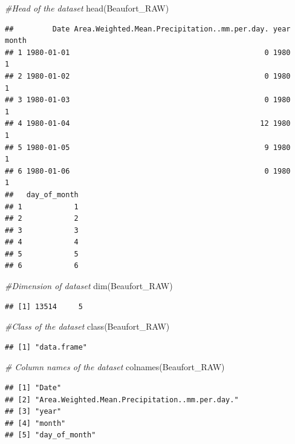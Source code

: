 \documentclass[
  12pt,
]{article}
\newenvironment{Shaded}{\begin{snugshade}}{\end{snugshade}}
\newcommand{\CommentTok}[1]{\textcolor[rgb]{0.56,0.35,0.01}{\textit{#1}}}
\newcommand{\FunctionTok}[1]{\textcolor[rgb]{0.00,0.00,0.00}{#1}}
\newcommand{\NormalTok}[1]{#1}
\begin{document}
\begin{Shaded}
\begin{Highlighting}[]
\CommentTok{\#Head of the dataset}
\FunctionTok{head}\NormalTok{(Beaufort\_RAW)}
\end{Highlighting}
\end{Shaded}

\begin{verbatim}
##         Date Area.Weighted.Mean.Precipitation..mm.per.day. year month
## 1 1980-01-01                                             0 1980     1
## 2 1980-01-02                                             0 1980     1
## 3 1980-01-03                                             0 1980     1
## 4 1980-01-04                                            12 1980     1
## 5 1980-01-05                                             9 1980     1
## 6 1980-01-06                                             0 1980     1
##   day_of_month
## 1            1
## 2            2
## 3            3
## 4            4
## 5            5
## 6            6
\end{verbatim}

\begin{Shaded}
\begin{Highlighting}[]
\CommentTok{\#Dimension of dataset}
\FunctionTok{dim}\NormalTok{(Beaufort\_RAW)}
\end{Highlighting}
\end{Shaded}

\begin{verbatim}
## [1] 13514     5
\end{verbatim}

\begin{Shaded}
\begin{Highlighting}[]
\CommentTok{\#Class of the dataset}
\FunctionTok{class}\NormalTok{(Beaufort\_RAW)}
\end{Highlighting}
\end{Shaded}

\begin{verbatim}
## [1] "data.frame"
\end{verbatim}

\begin{Shaded}
\begin{Highlighting}[]
\CommentTok{\# Column names of the dataset}
\FunctionTok{colnames}\NormalTok{(Beaufort\_RAW)}
\end{Highlighting}
\end{Shaded}

\begin{verbatim}
## [1] "Date"                                         
## [2] "Area.Weighted.Mean.Precipitation..mm.per.day."
## [3] "year"                                         
## [4] "month"                                        
## [5] "day_of_month"
\end{verbatim}
\end{document}
